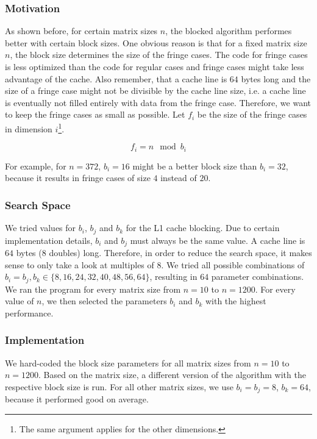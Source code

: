\documentclass[12pt]{article}
\begin{document}
\subsubsection{Motivation}
As shown before, for certain matrix sizes $n$, the blocked algorithm performes better with certain block sizes. One obvious reason is that for a fixed matrix size $n$, the block size determines the size of the fringe cases. The code for fringe cases is less optimized than the code for regular cases and fringe cases might take less advantage of the cache. Also remember, that a cache line is $64$ bytes long and the size of a fringe case might not be divisible by the cache line size, i.e. a cache line is eventually not filled entirely with data from the fringe case. Therefore, we want to keep the fringe cases as small as possible. Let $f_i$ be the size of the fringe cases in dimension $i$\footnote{The same argument applies for the other dimensions.}. 

$$f_i = n \mod b_i$$

For example, for $n=372$, $b_i=16$ might be a better block size than $b_i=32$, because it results in fringe cases of size $4$ instead of $20$.

\subsubsection{Search Space}
We tried values for $b_i$, $b_j$ and $b_k$ for the L1 cache blocking. Due to certain implementation details, $b_i$ and $b_j$ must always be the same value. A cache line is $64$ bytes ($8$ doubles) long. Therefore, in order to reduce the search space, it makes sense to only take a look at multiples of $8$. We tried all possible combinations of $b_i=b_j, b_k \in \{8, 16, 24, 32, 40, 48, 56, 64\}$, resulting in $64$ parameter combinations. We ran the program for every matrix size from $n=10$ to $n=1200$. For every value of $n$, we then selected the parameters $b_i$ and $b_k$ with the highest performance. 

\subsubsection{Implementation}
We hard-coded the block size parameters for all matrix sizes from $n=10$ to $n=1200$. Based on the matrix size, a different version of the algorithm with the respective block size is run. For all other matrix sizes, we use $b_i=b_j=8$, $b_k=64$, because it performed good on average.
\end{document}
